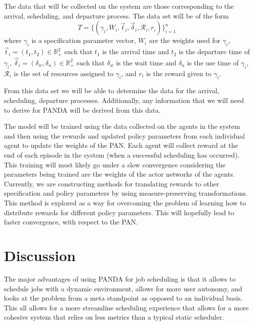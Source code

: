 \documentclass{article}
\theoremstyle{definition}
\theoremstyle{remark}
\begin{document}
		The data that will be collected on the system are those corresponding to the arrival, scheduling, and departure process. The data set will be of the form
		\[
		T = \{(\gamma_{i}, W_{i},\vec{t}_{i}, \vec{\delta}_{i}, \mathcal{R}_{i}, r_{i})\}_{i = 1}^{n} 
		\]
		where $\gamma_{i}$ is a specification parameter vector, $W_{i}$ are the weights used for $\gamma_{i}$, $\vec{t}_{i} = (t_{1}, t_{2}) \in \mathbb{R}_{+}^{2}$ such that $t_{1}$ is the arrival time and $t_{2}$ is the departure time of $\gamma_{i}$, $\vec{\delta}_{i} = (\delta_{w}, \delta_{u}) \in \mathbb{R}_{+}^{2}$ such that $\delta_{w}$ is the wait time and $\delta_{u}$ is the use time of $\gamma_{i}$, $\mathcal{R}_{i}$ is the set of resources assigned to $\gamma_{i}$, and $r_{i}$ is the reward given to $\gamma_{i}$. 
		
		From this data set we will be able to determine the data for the arrival, scheduling, departure processes. Additionally, any information that we will need to derive for PANDA will be derived from this data. 
		
		The model will be trained using the data collected on the agents in the system and then using the rewards and updated policy parameters from each individual agent to update the weights of the PAN. Each agent will collect reward at the end of each episode in the system (when a successful scheduling has occurred). This training will most likely go under a slow convergence considering the parameters being trained are the weights of the actor networks of the agents. Currently, we are constructing methods for translating rewards to other specification and policy parameters by using measure-preserving transformations. This method is explored as a way for overcoming the problem of learning how to distribute rewards for different policy parameters. This will hopefully lead to faster convergence, with respect to the PAN.

	\section{Discussion}
	
		The major advantages of using PANDA for job scheduling is that it allows to schedule jobs with a dynamic environment, allows for more user autonomy, and looks at the problem from a meta standpoint as opposed to an individual basis.  This all allows for a more streamline scheduling experience that allows for a more cohesive system that relies on less metrics than a typical static scheduler.
		
\end{document}
